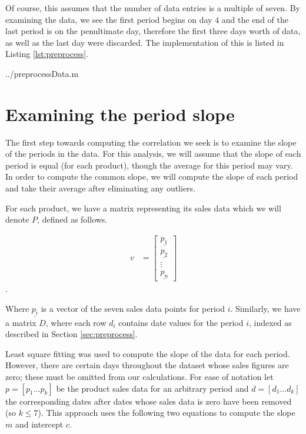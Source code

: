Of course, this assumes that the number of data entries is a multiple of seven. By examining the data, we see the first period begins on day $4$ and the end of the last period is on the penultimate day, therefore the first three days worth of data, as well as the last day were discarded. The implementation of this is listed in Listing \ref{lst:preprocess}.

  {../preprocessData.m}


\section{Examining the period slope}

The first step towards computing the correlation we seek is to examine the slope of the periods in the data. For this analysis, we will assume that the slope of each period is equal (for each product), though the average for this period may vary. In order to compute the common slope, we will compute the slope of each period and take their average after eliminating any outliers.

For each product, we have a matrix representing its sales data which we will denote $P$, defined as follows.

\begin{align}
   v &= \begin{bmatrix}
           \underline{p_{1}} \\
           \underline{p_{2}} \\
           \vdots \\
           \underline{p_{n}}
         \end{bmatrix}
  \end{align}.

Where $\underline{p_i}$ is a vector of the seven sales data points for period $i$. Similarly, we have a matrix $D$, where each row $d_i$ contains date values for the period $i$, indexed as described in Section \ref{sec:preprocess}.

Least square fitting was used to compute the slope of the data for each period. However, there are certain days throughout the dataset whose sales figures are zero; these must be omitted from our calculations. For ease of notation let $p = [p_1 \dots p_k]$ be the product sales data for an arbitrary period and $d = [d_1 \dots d_k]$ the corresponding dates after dates whose sales data is zero have been removed (so $k \leq 7$). This approach uses the following two equations to compute the slope $m$ and intercept $c$. 

